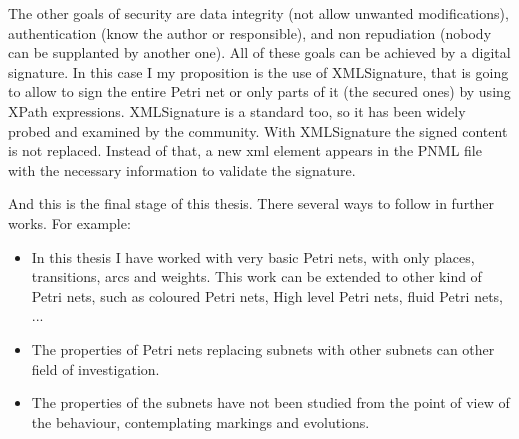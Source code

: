 The other goals of security are data integrity (not allow unwanted modifications), authentication (know the author or responsible), and non repudiation (nobody
can be supplanted by another one). All of these goals can be achieved by a digital
signature. In this case I my proposition is the use of XMLSignature, that is going to
allow to sign the entire Petri net or only parts of it (the secured ones)
by using XPath expressions. XMLSignature is a standard too, so it has been
widely probed and examined by the community. With XMLSignature the signed content is not replaced.
Instead of that, a new xml element appears in the PNML file with the necessary
information to validate the signature. 

And this is the final stage of this thesis. There several ways to follow in further works. For example:

\begin{itemize}
\item In this thesis I have worked with very basic Petri nets, with only
places, transitions, arcs and weights. This work can be extended to other kind
of Petri nets, such as coloured Petri nets, High level Petri nets, fluid
Petri nets, ...
\item The properties of Petri nets replacing subnets with other subnets can
other field of investigation.
\item The properties of the subnets have not been studied from the point of view
of the behaviour, contemplating markings and evolutions.  
\end{itemize} 

